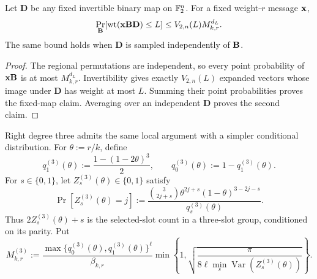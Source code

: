 \begin{corollary}
\label{cor:degree-five-dense-bound}
Let $\mathbf D$ be any fixed invertible binary map on $\mathbb F_2^n$.  For a fixed
weight-$r$ message $\mathbf x$,
\begin{equation}
 \Pr_{\mathbf B}[\operatorname{wt}(\mathbf x\mathbf B\mathbf D)\leq L]
 \leq V_{2,n}(L)M_{k,r}^{d_L}.
 \label{eq:degree-five-dense-bound}
\end{equation}
The same bound holds when $\mathbf D$ is sampled independently of $\mathbf B$.
\end{corollary}

\begin{proof}
The regional permutations are independent, so every point probability of
$\mathbf x\mathbf B$ is at most $M_{k,r}^{d_L}$.  Invertibility gives exactly
$V_{2,n}(L)$ expanded vectors whose image under $\mathbf D$ has weight at most
$L$.  Summing their point probabilities proves the fixed-map claim.
Averaging over an independent $\mathbf D$ proves the second claim.
\end{proof}

Right degree three admits the same local argument with a simpler conditional
distribution.  For $\theta:=r/k$, define
\begin{equation}
 q^{(3)}_1(\theta):=\frac{1-(1-2\theta)^3}{2},
 \qquad q^{(3)}_0(\theta):=1-q^{(3)}_1(\theta).
 \label{eq:degree-three-parity-probabilities}
\end{equation}
For $s\in\{0,1\}$, let $Z^{(3)}_s(\theta)\in\{0,1\}$ satisfy
\begin{equation}
 \Pr[Z^{(3)}_s(\theta)=j]
 :=\frac{\binom{3}{2j+s}\theta^{2j+s}(1-\theta)^{3-2j-s}}
 {q^{(3)}_s(\theta)}.
 \label{eq:degree-three-conditioned-half-count}
\end{equation}
Thus $2Z^{(3)}_s(\theta)+s$ is the selected-slot count in a three-slot group,
conditioned on its parity.  Put
\begin{equation}
 M^{(3)}_{k,r}:=
 \frac{\max\{q^{(3)}_0(\theta),q^{(3)}_1(\theta)\}^{\ell}}{\beta_{k,r}}
 \min\left\{1,
 \sqrt{\frac{\pi}{8\ell\min_s\operatorname{Var}(Z^{(3)}_s(\theta))}}
 \right\}.
 \label{eq:degree-three-point-mass}
\end{equation}

